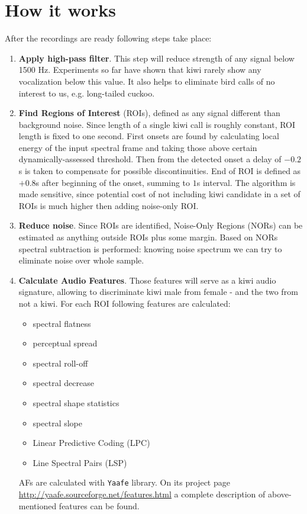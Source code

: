 \documentclass[paper=a4, fontsize=11pt]{scrartcl}	%
\numberwithin{equation}{section}		%
\numberwithin{figure}{section}			%
\numberwithin{table}{section}				%
\begin{document}
\section{How it works}
After the recordings are ready following steps take place:
\begin{enumerate}
	\item \textbf{Apply high-pass filter}. This step will reduce strength of any signal below 1500 Hz. Experiments so far have shown that kiwi rarely show any vocalization below this value. It also helps to eliminate bird calls of no interest to us, e.g. long-tailed cuckoo.
	\item \textbf{Find Regions of Interest} (ROIs), defined as any signal different than background noise. Since length of a single kiwi call is roughly constant, ROI length is fixed to one second. First onsets are found by calculating local energy of the input spectral frame and taking those above certain dynamically-assessed threshold. Then from the detected onset a delay of $-0.2$s is taken to compensate for possible discontinuities. End of ROI is defined as $+0.8$s after beginning of the onset, summing to $1$s interval. The algorithm is made sensitive, since potential cost of not including kiwi candidate in a set of ROIs is much higher then adding noise-only ROI.
	\item \textbf{Reduce noise}. Since ROIs are identified, Noise-Only Regions (NORs) can be estimated as anything outside ROIs plus some margin. Based on NORs spectral subtraction is performed: knowing noise spectrum we can try to eliminate noise over whole sample.
	\item \textbf{Calculate Audio Features}. Those features will serve as a kiwi audio signature, allowing to discriminate kiwi male from female - and the two from not a kiwi. For each ROI following features are calculated:
	\begin{itemize}
		\item spectral flatness
		\item perceptual spread
		\item spectral roll-off
		\item spectral decrease
		\item spectral shape statistics
		\item spectral slope
		\item Linear Predictive Coding (LPC)
		\item Line Spectral Pairs (LSP)
	\end{itemize}
	AFs are calculated with \texttt{Yaafe} library. On its project page \url{http://yaafe.sourceforge.net/features.html} a complete description of above-mentioned features can be found.

\end{enumerate}
\end{document}
